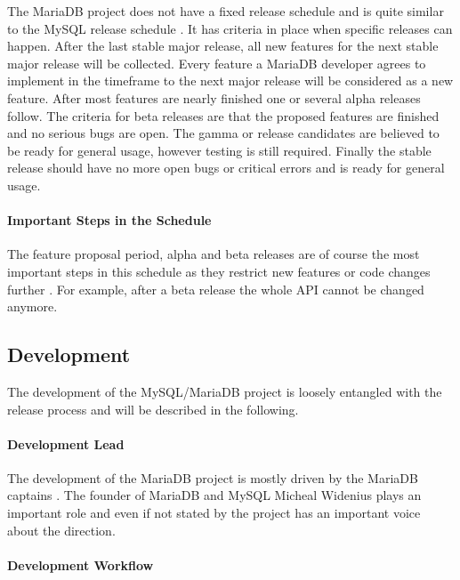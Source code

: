 The MariaDB project does not have a fixed release schedule and is quite similar
to the MySQL release schedule
\cite{MySQLReleaseCriteria,MySQLRoadmap,MySQLPlans}. It has criteria in place
when specific releases can happen. After the last stable major release, all new
features for the next stable major release will be collected. Every feature a
MariaDB developer agrees to implement in the timeframe to the next major
release will be considered as a new feature. After most features are nearly
finished one or several alpha releases follow. The criteria for beta releases
are that the proposed features are finished and no serious bugs are open. The
gamma or release candidates are believed to be ready for general usage, however
testing is still required. Finally the stable release should have no more open
bugs or critical errors and is ready for general usage.

\paragraph{Important Steps in the Schedule}

The feature proposal period, alpha and beta releases are of course the most
important steps in this schedule as they restrict new features or code changes
further \cite{MySQLReleaseCriteria}. For example, after a beta release the
whole \ac{API} cannot be changed anymore.

\subsection{Development}

The development of the MySQL/MariaDB project is loosely entangled with the
release process and will be described in the following.

\paragraph{Development Lead}

The development of the MariaDB project is mostly driven by the MariaDB captains
\cite{MySQLContributing,MySQLDevelopers}. The founder of MariaDB and MySQL
Micheal Widenius plays an important role and even if not stated by the project
has an important voice about the direction.

\paragraph{Development Workflow}

